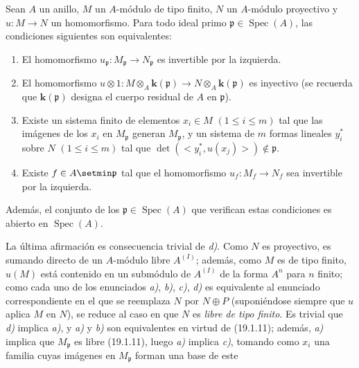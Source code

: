 \begin{corollary}[19.1.12]
\label{0.19.1.12-fr}
Sean $A$ un anillo, $M$ un $A$-módulo de tipo finito, $N$ un $A$-módulo
proyectivo y $u:M\to N$ un homomorfismo. Para todo ideal primo
$\mathfrak p\in\operatorname{Spec}(A)$, las condiciones siguientes son
equivalentes:
\begin{enumerate}
  \item[\textup{a)}] El homomorfismo
  $u_{\mathfrak p}:M_{\mathfrak p}\to N_{\mathfrak p}$ es invertible por la
  izquierda.
  \item[\textup{b)}] El homomorfismo
  $u\otimes1:M\otimes_A\boldsymbol{k}(\mathfrak p)\to N\otimes_A\boldsymbol{k}(\mathfrak p)$ es
  inyectivo \textup{(se recuerda que $\boldsymbol{k}(\mathfrak p)$ designa el cuerpo residual de $A$
  en $\mathfrak p$)}.
  \item[\textup{c)}] Existe un sistema finito de elementos $x_i\in M$
  $(1\leq i\leq m)$ tal que las imágenes de los $x_i$ en $M_{\mathfrak p}$
  generan $M_{\mathfrak p}$, y un sistema de $m$ formas lineales
  $y_i^*$ sobre $N$ $(1\leq i\leq m)$ tal que
  $\det(\mathopen{<}y_i^*,u(x_j)\mathclose{>})\notin\mathfrak p$.
  \item[\textup{d)}] Existe $f\in A\setmin\mathfrak p$ tal que el homomorfismo
  $u_f:M_f\to N_f$ sea invertible por la izquierda.
\end{enumerate}
Además, el conjunto de los $\mathfrak p\in\operatorname{Spec}(A)$ que verifican
estas condiciones es abierto en $\operatorname{Spec}(A)$.
\end{corollary}

La última afirmación es consecuencia trivial de \emph{d)}. Como $N$ es proyectivo, es
sumando directo de un $A$-módulo libre $A^{(I)}$; además, como $M$ es de tipo
finito, $u(M)$ está contenido en un submódulo de $A^{(I)}$ de la forma $A^n$
para $n$ finito; como cada uno de los enunciados \emph{a)}, \emph{b)}, \emph{c)}, \emph{d)} es equivalente
al enunciado correspondiente en el que se reemplaza $N$ por $N\oplus P$
(suponiéndose siempre que $u$ aplica $M$ en $N$), se reduce al caso en que $N$
es \emph{libre de tipo finito}. Es trivial que \emph{d)} implica \emph{a)}, y \emph{a)} y \emph{b)} son
equivalentes en virtud de (19.1.11); además, \emph{a)} implica que
$M_{\mathfrak p}$ es libre (19.1.11), luego \emph{a)} implica \emph{c)}, tomando como $x_i$
una familia cuyas imágenes en $M_{\mathfrak p}$ forman una base de este


